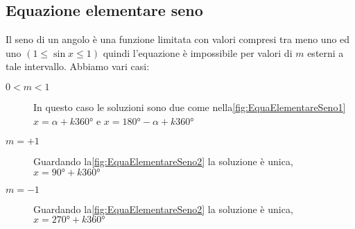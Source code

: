 \subsection{Equazione elementare seno }
Il seno di un angolo è una funzione limitata con valori compresi tra meno uno ed uno $(1\leq\sin x\leq 1)$ quindi l'equazione è impossibile per valori di $m$ esterni a tale intervallo. Abbiamo vari casi:
\begin{description}
	\item[$0<m<1$] In questo caso le soluzioni sono due come nella\nobs\vref{fig:EquaElementareSeno1} $x=\alpha+k\ang{360}$ e $x=\ang{180}-\alpha+k\ang{360}$
	\item [$m=+1$] Guardando la\nobs\vref{fig:EquaElementareSeno2} la soluzione è unica, $x=\ang{90}+k\ang{360}$
	\item [$m=-1$] Guardando la\nobs\vref{fig:EquaElementareSeno2} la soluzione è unica, $x=\ang{270}+k\ang{360}$
\end{description} 
\begin{figure}
	\begin{subfigure}[b]{.5\linewidth}
		\centering
			
			\label{fig:EquaElementareSeno1}
	\end{subfigure}%
	\begin{subfigure}[b]{.5\linewidth}
		\centering
		
		\label{fig:EquaElementareCoseno1}
	\end{subfigure}
	\label{fig:EquaElementareSenoCoseno}
\end{figure}
\begin{figure}
	\begin{subfigure}[b]{.5\linewidth}
		\centering
			
			\label{fig:EquaElementareSeno4}
	\end{subfigure}%
	\begin{subfigure}[b]{.5\linewidth}
		\centering
		
		\label{fig:EquaElementareCoseno4}
	\end{subfigure}
	\label{fig:EquaElementareSenoCoseno2}
\end{figure}
